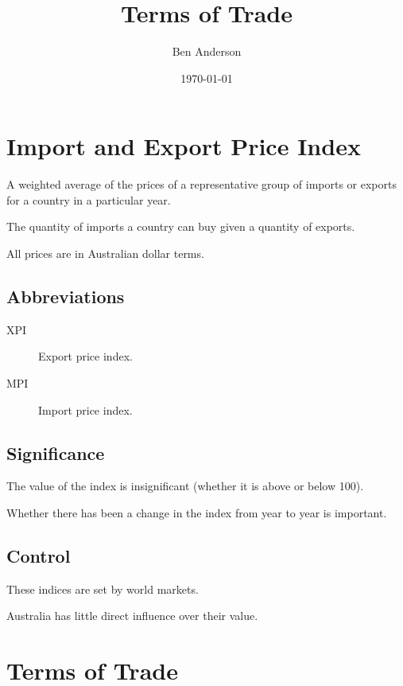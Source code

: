 \documentclass[a4paper,11pt]{article}
\begin{document}
\title{Terms of Trade}
\author{Ben Anderson}
\date{\today}
\maketitle
\pagebreak

\tableofcontents
\pagebreak


\section{Import and Export Price Index}

A weighted average of the prices of a representative group of imports or
exports for a country in a particular year.

The quantity of imports a country can buy given a quantity of exports.

All prices are in Australian dollar terms.


\subsection{Abbreviations}

\begin{description}
\item [XPI] Export price index.
\item [MPI] Import price index.
\end{description}


\subsection{Significance}

The value of the index is insignificant (whether it is above or below 100).

Whether there has been a change in the index from year to year is important.


\subsection{Control}

These indices are set by world markets.

Australia has little direct influence over their value.




\section{Terms of Trade}
\end{document}
